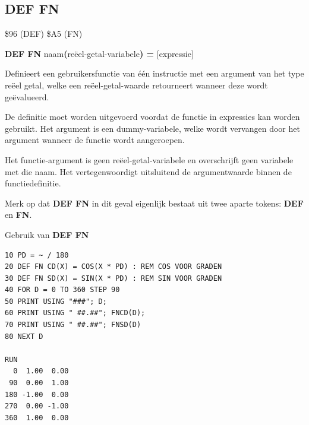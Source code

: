 \subsection{DEF FN}
\begin{description}[leftmargin=2cm,style=nextline]
\item [Token:]   \$96 (DEF) \$A5 (FN)

\item [Formaat:]  {\bf DEF FN} naam{\bf(}reëel-getal-variabele{\bf) =} [expressie]

\item [Gebruik:]   Definieert een gebruikersfunctie van één instructie met een argument van het type reëel getal, welke een reëel-getal-waarde retourneert wanneer deze wordt geëvalueerd.

                 De definitie moet worden uitgevoerd voordat de functie in expressies kan worden gebruikt. Het argument is een dummy-variabele, welke wordt vervangen door het argument wanneer de functie wordt aangeroepen.

\item [Opmerkingen:] Het functie-argument is geen reëel-getal-variabele en overschrijft geen variabele met die naam. Het vertegenwoordigt uitsluitend de argumentwaarde binnen de functiedefinitie.

                 Merk op dat {\bf DEF FN} in dit geval eigenlijk bestaat uit twee aparte tokens: {\bf DEF} en {\bf FN}.

\item [Voorbeeld:] Gebruik van {\bf DEF FN}

\begin{tcolorbox}[colback=black,coltext=white]
\verbatimfont{\codefont}
\begin{verbatim}
10 PD = ~ / 180
20 DEF FN CD(X) = COS(X * PD) : REM COS VOOR GRADEN
30 DEF FN SD(X) = SIN(X * PD) : REM SIN VOOR GRADEN
40 FOR D = 0 TO 360 STEP 90
50 PRINT USING "###"; D;
60 PRINT USING " ##.##"; FNCD(D);
70 PRINT USING " ##.##"; FNSD(D)
80 NEXT D

RUN
  0  1.00  0.00
 90  0.00  1.00
180 -1.00  0.00
270  0.00 -1.00
360  1.00  0.00
\end{verbatim}
\end{tcolorbox}
\end{description}


\newpage
